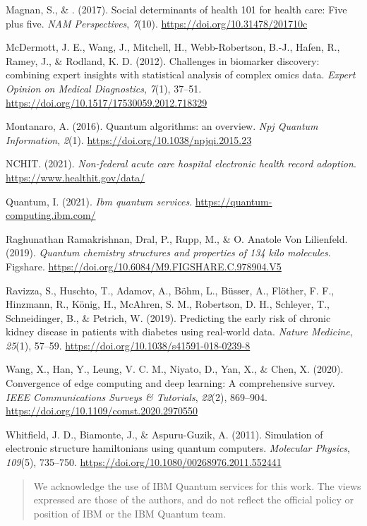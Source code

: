 \documentclass{scrartcl}
\begin{document}
\begin{hangparas}{1.5em}{1}
\hypertarget{citeproc_bib_item_10}{Magnan, S., \& . (2017). Social determinants of health 101 for health care: Five plus five. \textit{NAM Perspectives}, \textit{7}(10). \url{https://doi.org/10.31478/201710c}}

\hypertarget{citeproc_bib_item_11}{McDermott, J. E., Wang, J., Mitchell, H., Webb-Robertson, B.-J., Hafen, R., Ramey, J., \& Rodland, K. D. (2012). Challenges in biomarker discovery: combining expert insights with statistical analysis of complex omics data. \textit{Expert Opinion on Medical Diagnostics}, \textit{7}(1), 37–51. \url{https://doi.org/10.1517/17530059.2012.718329}}

\hypertarget{citeproc_bib_item_12}{Montanaro, A. (2016). Quantum algorithms: an overview. \textit{Npj Quantum Information}, \textit{2}(1). \url{https://doi.org/10.1038/npjqi.2015.23}}

\hypertarget{citeproc_bib_item_13}{NCHIT. (2021). \textit{Non-federal acute care hospital electronic health record adoption}. \url{https://www.healthit.gov/data/}}

\hypertarget{citeproc_bib_item_14}{Quantum, I. (2021). \textit{Ibm quantum services}. \url{https://quantum-computing.ibm.com/}}

\hypertarget{citeproc_bib_item_15}{Raghunathan Ramakrishnan, Dral, P., Rupp, M., \& O. Anatole Von Lilienfeld. (2019). \textit{Quantum chemistry structures and properties of 134 kilo molecules}. Figshare. \url{https://doi.org/10.6084/M9.FIGSHARE.C.978904.V5}}

\hypertarget{citeproc_bib_item_16}{Ravizza, S., Huschto, T., Adamov, A., Böhm, L., Büsser, A., Flöther, F. F., Hinzmann, R., König, H., McAhren, S. M., Robertson, D. H., Schleyer, T., Schneidinger, B., \& Petrich, W. (2019). Predicting the early risk of chronic kidney disease in patients with diabetes using real-world data. \textit{Nature Medicine}, \textit{25}(1), 57–59. \url{https://doi.org/10.1038/s41591-018-0239-8}}

\hypertarget{citeproc_bib_item_17}{Wang, X., Han, Y., Leung, V. C. M., Niyato, D., Yan, X., \& Chen, X. (2020). Convergence of edge computing and deep learning: A comprehensive survey. \textit{IEEE Communications Surveys \& Tutorials}, \textit{22}(2), 869–904. \url{https://doi.org/10.1109/comst.2020.2970550}}

\hypertarget{citeproc_bib_item_18}{Whitfield, J. D., Biamonte, J., \& Aspuru-Guzik, A. (2011). Simulation of electronic structure hamiltonians using quantum computers. \textit{Molecular Physics}, \textit{109}(5), 735–750. \url{https://doi.org/10.1080/00268976.2011.552441}}
\end{hangparas}

\begin{quote}
We acknowledge the use of IBM Quantum services for this work. The views expressed are those of the authors, and do not reflect the official policy or position of IBM or the IBM Quantum team.
\end{quote}
\end{document}
